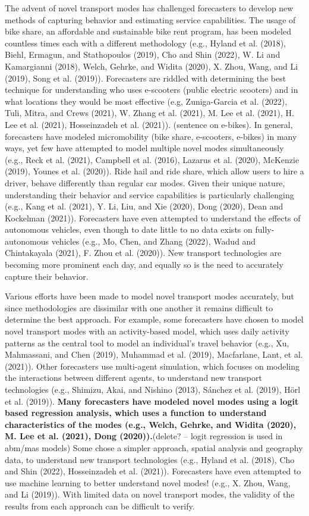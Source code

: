 \documentclass[12pt, oneside, openright]{byuthesis}
\begin{document}
The advent of novel transport modes has challenged forecasters to develop new methods of capturing behavior and estimating service capabilities. The usage of bike share, an affordable and sustainable bike rent program, has been modeled countless times each with a different methodology (e.g., Hyland et al. (2018), Biehl, Ermagun, and Stathopoulos (2019), Cho and Shin (2022), W. Li and Kamargianni (2018), Welch, Gehrke, and Widita (2020), X. Zhou, Wang, and Li (2019), Song et al. (2019)). Forecasters are riddled with determining the best technique for understanding who uses e-scooters (public electric scooters) and in what locations they would be most effective (e.g, Zuniga-Garcia et al. (2022), Tuli, Mitra, and Crews (2021), W. Zhang et al. (2021), M. Lee et al. (2021), H. Lee et al. (2021), Hosseinzadeh et al. (2021)). (sentence on e-bikes). In general, forecasters have modeled micromobility (bike share, e-scooters, e-bikes) in many ways, yet few have attempted to model multiple novel modes simultaneously (e.g., Reck et al. (2021), Campbell et al. (2016), Lazarus et al. (2020), McKenzie (2019), Younes et al. (2020)). Ride hail and ride share, which allow users to hire a driver, behave differently than regular car modes. Given their unique nature, understanding their behavior and service capabilities is particularly challenging (e.g., Kang et al. (2021), Y. Li, Liu, and Xie (2020), Dong (2020), Dean and Kockelman (2021)). Forecasters have even attempted to understand the effects of autonomous vehicles, even though to date little to no data exists on fully-autonomous vehicles (e.g., Mo, Chen, and Zhang (2022), Wadud and Chintakayala (2021), F. Zhou et al. (2020)). New transport technologies are becoming more prominent each day, and equally so is the need to accurately capture their behavior.

Various efforts have been made to model novel transport modes accurately, but since methodologies are dissimilar with one another it remains difficult to determine the best approach. For example, some forecasters have chosen to model novel transport modes with an activity-based model, which uses daily activity patterns as the central tool to model an individual's travel behavior (e.g., Xu, Mahmassani, and Chen (2019), Muhammad et al. (2019), Macfarlane, Lant, et al. (2021)). Other forecasters use multi-agent simulation, which focuses on modeling the interactions between different agents, to understand new transport technologies (e.g., Shimizu, Akai, and Nishino (2013), Sánchez et al. (2019), Hörl et al. (2019)). \textbf{Many forecasters have modeled novel modes using a logit based regression analysis, which uses a function to understand characteristics of the modes (e.g., Welch, Gehrke, and Widita (2020), M. Lee et al. (2021), Dong (2020)).}(delete? -- logit regression is used in abm/mas models) Some chose a simpler approach, spatial analysis and geography data, to understand new transport technologies (e.g., Hyland et al. (2018), Cho and Shin (2022), Hosseinzadeh et al. (2021)). Forecasters have even attempted to use machine learning to better understand novel modes! (e.g., X. Zhou, Wang, and Li (2019)). With limited data on novel transport modes, the validity of the results from each approach can be difficult to verify.
\end{document}
